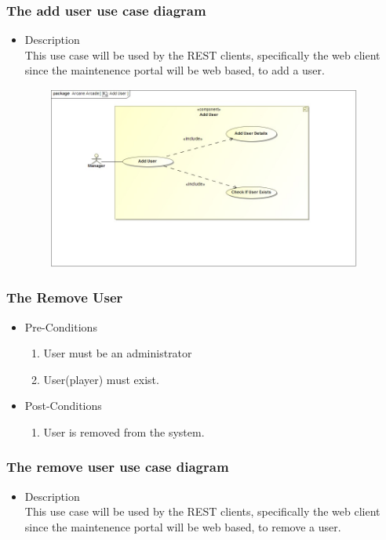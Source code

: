 \documentclass[english]{article}
\begin{document}
		\subsubsection* {The add user use case diagram}
		\begin{itemize}
			\item Description\\
			This use case will be used by the REST clients, specifically the web client since the maintenence portal will be web based, to add a user.
		\end{itemize}
		\includegraphics[width=14cm,height=6cm,keepaspectratio]{addUser.jpg}
		
		
		\subsubsection{The Remove User}
		
			\begin{itemize}
	
		
		\item Pre-Conditions
			\begin{enumerate}
				\item User must be an administrator
				\item User(player) must exist.
			\end{enumerate}
		\item Post-Conditions
			\begin{enumerate}
			\item User is removed from the system.
						
			\end{enumerate}
	

		\end{itemize}
		
		
		\subsubsection* {The remove user use case diagram}
		\begin{itemize}
			\item Description\\
			This use case will be used by the REST clients, specifically the web client since the maintenence 					portal will be web based, to remove a user.
		\end{itemize}
		
\end{document}
